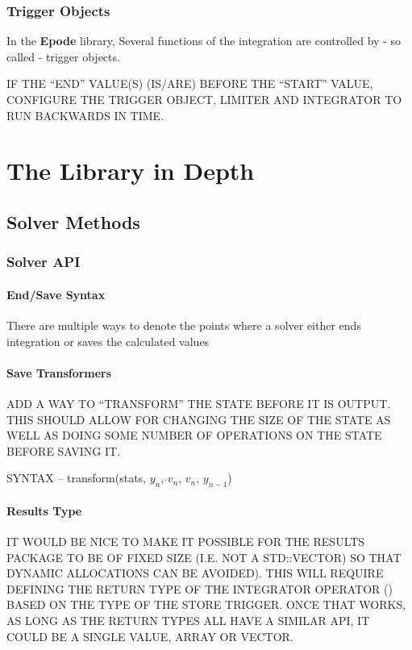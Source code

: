 \documentclass[letterpaper,10pt]{book}
\newcommand{\epode}[0]{\textbf{Epode}}
\begin{document}
    \section{Trigger Objects}
      In the \epode{} library, Several functions of the integration are controlled by - so called - trigger objects.
      
      IF THE ``END'' VALUE(S) (IS/ARE) BEFORE THE ``START'' VALUE, CONFIGURE THE TRIGGER OBJECT, LIMITER AND INTEGRATOR TO RUN BACKWARDS IN TIME.

\part{The Library in Depth}
  \chapter{Solver Methods}
    \section{Solver API}
    
      \subsection{End/Save Syntax}
	There are multiple ways to denote the points where a solver either ends integration or saves the calculated values
	
      \subsection{Save Transformers}
	ADD A WAY TO ``TRANSFORM'' THE STATE BEFORE IT IS OUTPUT.  THIS SHOULD ALLOW FOR CHANGING THE SIZE OF THE STATE AS WELL AS DOING SOME NUMBER OF OPERATIONS ON THE STATE BEFORE SAVING IT.
	
	SYNTAX -- transform(stats, $y_{n}$, $\dot{}v_{n}$, $v_{n}$, $y_{n-1}$)
	
      \subsection{Results Type}
      IT WOULD BE NICE TO MAKE IT POSSIBLE FOR THE RESULTS PACKAGE TO BE OF FIXED SIZE (I.E. NOT A STD::VECTOR) SO THAT DYNAMIC ALLOCATIONS CAN BE AVOIDED).  THIS WILL REQUIRE DEFINING THE RETURN TYPE OF THE INTEGRATOR OPERATOR () BASED ON THE TYPE OF THE STORE TRIGGER.  ONCE THAT WORKS, AS LONG AS THE RETURN TYPES ALL HAVE A SIMILAR API, IT COULD BE A SINGLE VALUE, ARRAY OR VECTOR.
      
\end{document}
